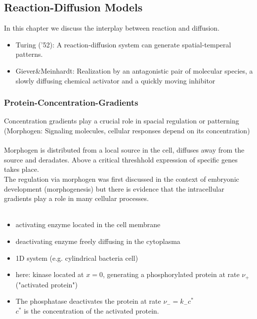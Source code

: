 \subsection{Reaction-Diffusion Models}
In this chapter we discuss the interplay between reaction and diffusion.
\begin{itemize}[label={}]
	\item Turing ('52): A reaction-diffusion system can generate spatial-temperal patterns.
	\item Giever\&{}Meinhardt: Realization by an antagonistic pair of molecular species, a slowly diffusing chemical activator and a quickly moving inhibitor
\end{itemize}
\subsubsection{Protein-Concentration-Gradients}
Concentration gradients play a crucial role in spacial regulation or patterning (Morphogen: Signaling molecules, cellular responses depend on its concentration)\vspace{0.1cm}\\
\textbf{\underline{}}\vspace{0.2cm}\\
Morphogen is distributed from a local source in the cell, diffuses away from the source and deradates. Above a critical threshhold expression of specific genes takes place.\\
The regulation via morphogen was first discussed in the context of embryonic development (morphogenesis) but there is evidence that the intracellular gradients play a role in many cellular processes.\vspace{0.2cm}\\
\textbf{\underline{}}\vspace{0.3cm}\\
\textbf{\underline{}}
\begin{itemize}[label={$-$}]
	\item activating enzyme located in the cell membrane
	\item deactivating enzyme freely diffusing in the cytoplasma
	\item 1D system (e.g. cylindrical bacteria cell)
	\item here: kinase located at $x=0$, generating a phosphorylated protein at rate $\nu_+$ ("activated protein")
	\item The phosphatase deactivates the protein at rate $\nu_-=k_-c^\ast$\\
		$c^\ast$ is the concentration of the activated protein.
\end{itemize}
